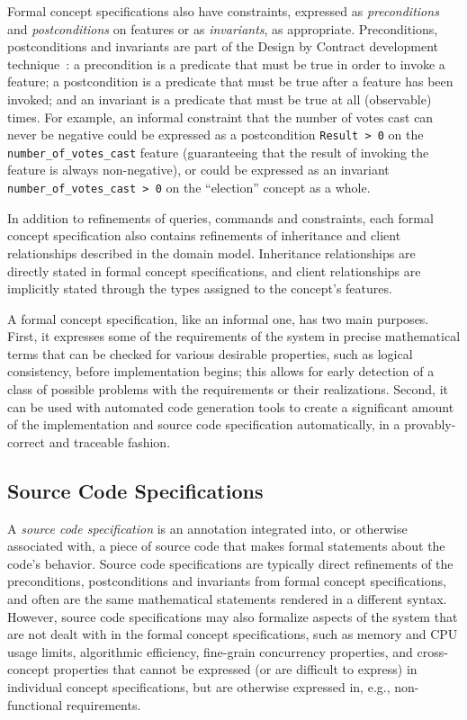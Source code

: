 Formal concept specifications also have constraints, expressed as
\emph{preconditions} and \emph{postconditions} on features or as
\emph{invariants}, as appropriate. Preconditions, postconditions and
invariants are part of the Design by Contract development
technique~\cite{OOSC}: a precondition is a predicate that must be true
in order to invoke a feature; a postcondition is a predicate that must
be true after a feature has been invoked; and an invariant is a
predicate that must be true at all (observable) times. For example, an
informal constraint that the number of votes cast can never be
negative could be expressed as a postcondition \texttt{Result > 0} on
the \texttt{number\_of\_votes\_cast} feature (guaranteeing that the
result of invoking the feature is always non-negative), or could be
expressed as an invariant \texttt{number\_of\_votes\_cast > 0} on the
``election'' concept as a whole.

In addition to refinements of queries, commands and constraints, each
formal concept specification also contains refinements of inheritance
and client relationships described in the domain model. Inheritance
relationships are directly stated in formal concept specifications,
and client relationships are implicitly stated through the types
assigned to the concept's features.

A formal concept specification, like an informal one, has two main
purposes. First, it expresses some of the requirements of the system
in precise mathematical terms that can be checked for various
desirable properties, such as logical consistency, before
implementation begins; this allows for early detection of a class of
possible problems with the requirements or their realizations. Second,
it can be used with automated code generation tools to create a
significant amount of the implementation and source code specification
automatically, in a provably-correct and traceable fashion.

\subsection{Source Code Specifications}

A \emph{source code specification} is an annotation integrated into,
or otherwise associated with, a piece of source code that makes formal
statements about the code's behavior. Source code specifications are
typically direct refinements of the preconditions, postconditions and
invariants from formal concept specifications, and often are the same
mathematical statements rendered in a different syntax. However,
source code specifications may also formalize aspects of the system
that are not dealt with in the formal concept specifications, such as
memory and CPU usage limits, algorithmic efficiency, fine-grain
concurrency properties, and cross-concept properties that cannot be
expressed (or are difficult to express) in individual concept
specifications, but are otherwise expressed in, e.g., non-functional
requirements.

